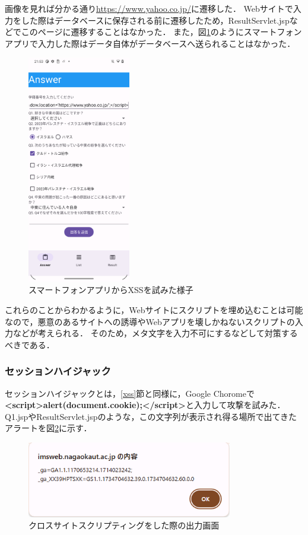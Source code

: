 \documentclass[titlepage,a4paper]{jsarticle}
\begin{document}
画像を見れば分かる通り\url{https://www.yahoo.co.jp/}に遷移した．
Webサイトで入力をした際はデータベースに保存される前に遷移したため，ResultServlet.jspなどでこのページに遷移することはなかった．
また，図\ref{app_yahoo}のようにスマートフォンアプリで入力した際はデータ自体がデータベースへ送られることはなかった．
\begin{figure}[H]
  \centering
  \includegraphics[width=0.4\textwidth]{img/security/app_yahoo.png}
  \caption{スマートフォンアプリからXSSを試みた様子}
  \label{app_yahoo}
\end{figure}
これらのことからわかるように，Webサイトにスクリプトを埋め込むことは可能なので，悪意のあるサイトへの誘導やWebアプリを壊しかねないスクリプトの入力などが考えられる．
そのため，メタ文字を入力不可にするなどして対策するべきである．
\subsubsection{セッションハイジャック}
セッションハイジャックとは，\ref{xss}節と同様に，Google Choromeで\\\textbf{\textless script\textgreater alert(document.cookie);\textless /script\textgreater}と入力して攻撃を試みた．
Q1.jspやResultServlet.jspのような，この文字列が表示され得る場所で出てきたアラートを図\ref{alert}に示す．
\begin{figure}[H]
  \centering
  \includegraphics[width=0.8\textwidth]{img/security/alert.png}
  \caption{クロスサイトスクリプティングをした際の出力画面}
  \label{alert}
\end{figure}
\end{document}
